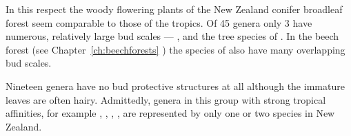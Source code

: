 In this respect the woody flowering plants of the New Zealand conifer broadleaf forest seem comparable to those of the tropics.
Of 45 genera only 3 have numerous, relatively large bud scales --- ,  and the tree species of .
In the beech forest (see Chapter~\ref{ch:beechforests} ) the species of  also have many overlapping bud scales.

Nineteen genera have no bud protective structures at all although the immature leaves are often hairy.
Admittedly, genera in this group with strong tropical affinities, for example , , , , are represented by only one or two species in New Zealand.

